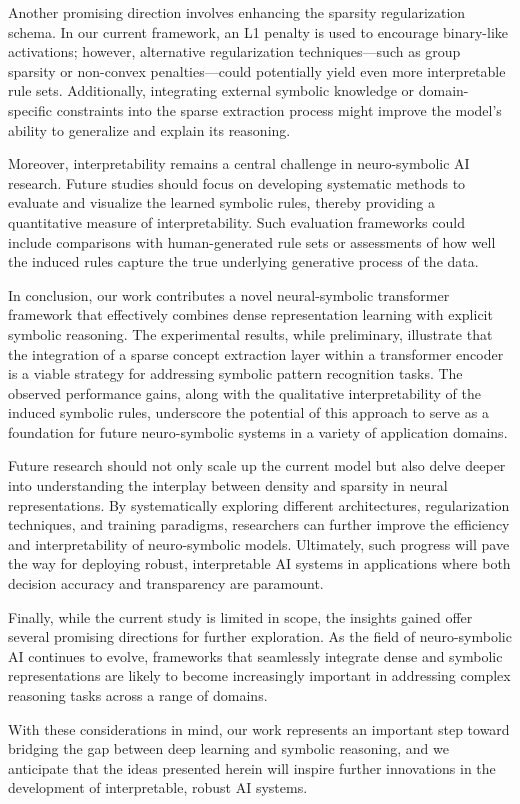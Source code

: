 \documentclass{article}
\begin{document}
Another promising direction involves enhancing the sparsity regularization schema. In our current framework, an L1 penalty is used to encourage binary-like activations; however, alternative regularization techniques—such as group sparsity or non-convex penalties—could potentially yield even more interpretable rule sets. Additionally, integrating external symbolic knowledge or domain-specific constraints into the sparse extraction process might improve the model’s ability to generalize and explain its reasoning.

Moreover, interpretability remains a central challenge in neuro-symbolic AI research. Future studies should focus on developing systematic methods to evaluate and visualize the learned symbolic rules, thereby providing a quantitative measure of interpretability. Such evaluation frameworks could include comparisons with human-generated rule sets or assessments of how well the induced rules capture the true underlying generative process of the data.

In conclusion, our work contributes a novel neural-symbolic transformer framework that effectively combines dense representation learning with explicit symbolic reasoning. The experimental results, while preliminary, illustrate that the integration of a sparse concept extraction layer within a transformer encoder is a viable strategy for addressing symbolic pattern recognition tasks. The observed performance gains, along with the qualitative interpretability of the induced symbolic rules, underscore the potential of this approach to serve as a foundation for future neuro-symbolic systems in a variety of application domains.

Future research should not only scale up the current model but also delve deeper into understanding the interplay between density and sparsity in neural representations. By systematically exploring different architectures, regularization techniques, and training paradigms, researchers can further improve the efficiency and interpretability of neuro-symbolic models. Ultimately, such progress will pave the way for deploying robust, interpretable AI systems in applications where both decision accuracy and transparency are paramount.

Finally, while the current study is limited in scope, the insights gained offer several promising directions for further exploration. As the field of neuro-symbolic AI continues to evolve, frameworks that seamlessly integrate dense and symbolic representations are likely to become increasingly important in addressing complex reasoning tasks across a range of domains.

With these considerations in mind, our work represents an important step toward bridging the gap between deep learning and symbolic reasoning, and we anticipate that the ideas presented herein will inspire further innovations in the development of interpretable, robust AI systems.
\end{document}
